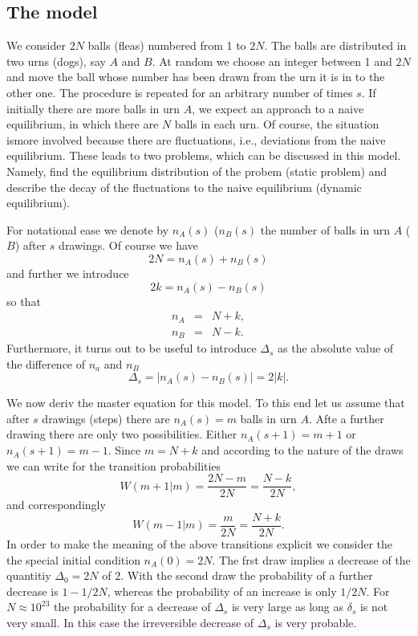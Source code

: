 \subsection{The model}
We consider $2N$ balls (fleas) numbered from 1 to $2N$. The balls are
distributed in two urns (dogs), say $A$ and $B$. At random we choose an
integer between 1 and $2N$ and move the ball whose number has been drawn from 
the urn it is in to the other one. The procedure is repeated for an arbitrary
number of times $s$. If initially there are more balls in urn $A$, we expect
an approach to a naive  equilibrium, in which there are $N$ balls in each urn.
Of course, the situation ismore involved because there are fluctuations, i.e.,
deviations from the naive equilibrium. These leads to two problems, which can
be discussed in this model. Namely, find the equilibrium distribution of the
probem (static problem) and describe the decay of the fluctuations to the
naive equilibrium (dynamic equilibrium).  


For notational ease we denote by $n_A(s)$ ($n_B(s)$ the 
number of balls in urn $A$ ($B$) after $s$ drawings. Of course we have
\begin{displaymath}
  2N = n_A(s) + n_B(s)
\end{displaymath}
and further we introduce
\begin{displaymath}
  2 k = n_A(s) - n_B(s)
\end{displaymath}
so that
\begin{eqnarray*}
  n_A & = & N+k, \\
  n_B & = & N-k.
\end{eqnarray*}
Furthermore, it turns out to be useful to introduce $\Delta_s$ as the  
absolute value of the difference of $n_a$ and $n_B$
\begin{displaymath}
  \Delta_s = |n_A(s) - n_B(s) | = 2 |k|.
\end{displaymath}

We now deriv the master equation for this model.
To this end let us assume that after $s$ drawings (steps) there are 
$n_A(s) = m$  balls in urn $A$. Afte a further drawing there are only two
possibilities. Either $n_A(s+1) = m+1$ or $n_A(s+1) = m-1$. Since $m=N+k$ and
according to the nature of the draws we
can write for the transition probabilities
\begin{equation}
\label{eq:NonWEhren1}
  W(m+1|m) = \frac{2N-m}{2N} = \frac{N-k}{2N},
\end{equation}
and correspondingly
\begin{equation}
\label{eq:NonWEhren2}
   W(m-1|m) = \frac{m}{2N} = \frac{N+k}{2N}.
\end{equation}
In order to make the meaning of the above transitions explicit we consider the
the special initial condition $n_A(0) = 2N$. The frst draw implies a decrease
of the quantitiy $\Delta_0=2N$ of 2. With the second draw the probability of a
further decrease is $1-1/2N$, whereas the probability of an increase is only
$1/2N$.  For $N \approx 10^{23}$ the probability for a decrease of $\Delta_s$
is very large as long as $\delta_s$ is not very small. In this case the
irreversible decrease of $\Delta_s$ is very probable. 

